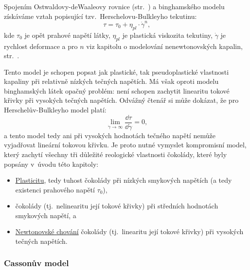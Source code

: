 \documentclass[12pt]{article}
\begin{document}
Spojením Ostwaldovy-deWaaleovy rovnice (str.~\pageref{eq:ostwald_dewaale}) a binghamského modelu získáváme vztah popisující tzv.~Herschelovu-Bulkleyho tekutinu:~\cite{Article:Comparison_of_models_chocolate}\cite{Article:Extended_casson_equation}
\begin{equation}
    \tau = \tau_0 + \eta_{pl}\cdot\dot\gamma^n\text{,}
\end{equation}
kde $\tau_0$ je opět prahové napětí látky, $\eta_{pl}$ je plastická viskozita tekutiny, $\dot\gamma$ je rychlost deformace a pro $n$ viz kapitolu o modelování nenewtonovských kapalin, str.~\pageref{eq:ostwald_dewaale}.
\par\noindent
Tento model je schopen popsat jak plastické, tak pseudoplastické vlastnosti kapaliny při relativně nízkých tečných napětích. Má však oproti modelu binghamských látek opačný problém: není schopen zachytit linearitu tokové křivky při vysokých tečných napětích. Odvážný čtenář si může dokázat, že pro Herschelův-Bulkleyho model platí:
\begin{equation}
    \lim_{\dot\gamma\to\infty} \frac{\dd\tau}{\dd\dot\gamma} = 0\text{,}
\end{equation}
a tento model tedy ani při vysokých hodnotách tečného napětí nemůže vyjadřovat lineární tokovou křivku. Je proto nutné vymyslet kompromisní model, který zachytí všechny tři důležité reologické vlastnosti čokolády, které byly popsány v~úvodu této kapitoly:
\begin{itemize}[noitemsep, topsep = 0pt]
    \item \underline{Plasticitu}, tedy tuhost čokolády při nízkých smykových napětích (a tedy existenci prahového napětí $\tau_0$),
    \item \underline{} čokolády (tj.~nelinearitu její tokové křivky) při středních hodnotách smykových napětí, a
    \item \underline{Newtonovské chování} čokolády (tj.~linearitu její tokové křivky) při vysokých tečných napětích.
\end{itemize}

\subsubsection{Cassonův model}%
\label{sec:Casson}
\end{document}
